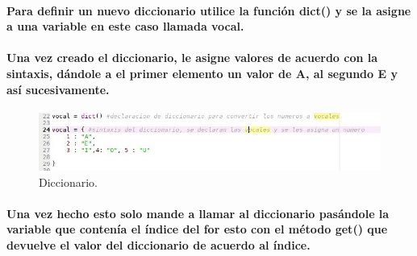 \documentclass[10pt,a4paper]{article}
\begin{document}
 \paragraph{Para definir un nuevo diccionario utilice la funci\'on dict() y se la asigne a una variable en este caso llamada vocal.}


 
\paragraph{Una vez creado el diccionario, le asigne valores de acuerdo con la sintaxis, d\'andole a el primer elemento un valor de A, al segundo E y as\'i sucesivamente.}
\begin{figure}[H]
\includegraphics[scale=0.5] {img3.jpg}
\caption{Diccionario.}
\label{fig:cod3}
\end{figure}
\paragraph{Una vez hecho esto solo mande a llamar al diccionario pas\'andole la variable que conten\'ia el \'indice del for esto con el m\'etodo get() que devuelve el valor del diccionario de acuerdo al \'indice.}
\end{document}
